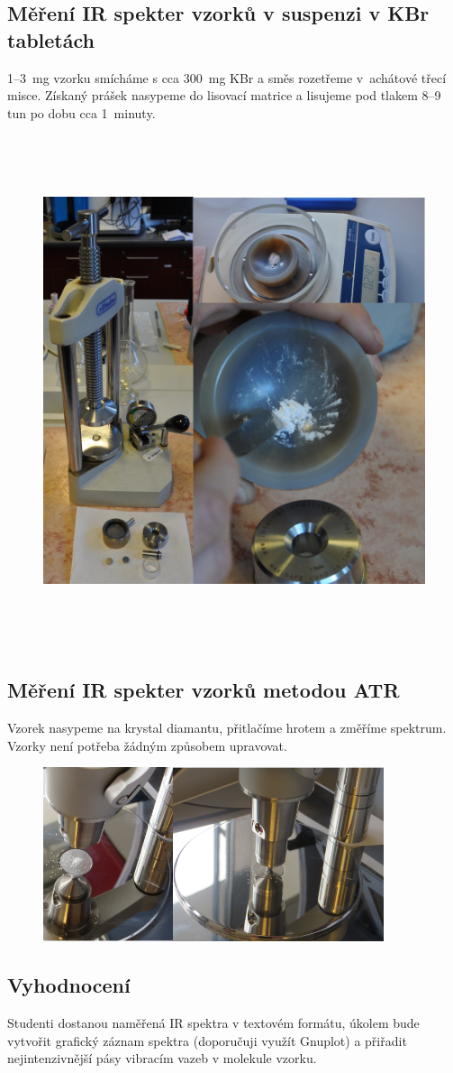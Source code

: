 \documentclass[12pt]{article}
\begin{document}
\newpage

\subsection{Měření IR spekter vzorků v suspenzi v KBr tabletách}
	1--3~mg vzorku smícháme s cca 300~mg KBr a směs rozetřeme v~achátové třecí misce. Získaný prášek nasypeme do lisovací matrice a lisujeme pod tlakem 8--9 tun po dobu cca 1~minuty.

\begin{figure}[h]
	\includegraphics[keepaspectratio,height=15cm]{img/KBr.png}
\end{figure}
\newpage

\subsection{Měření IR spekter vzorků metodou ATR}
Vzorek nasypeme na krystal diamantu, přitlačíme hrotem a změříme spektrum. Vzorky není potřeba žádným způsobem upravovat.

\begin{figure}[h]
	\includegraphics[keepaspectratio,width=10cm]{img/atr.png}
\end{figure}

\subsection{Vyhodnocení}

Studenti dostanou naměřená IR spektra v textovém formátu, úkolem bude vytvořit grafický záznam spektra (doporučuji využít Gnuplot) a přiřadit nejintenzivnější pásy vibracím vazeb v molekule vzorku.
\end{document}
